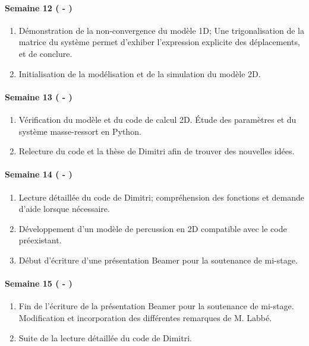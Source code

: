 \paragraph{Semaine 12 ( - )} 
\begin{enumerate}
    \item Démonstration de la non-convergence du modèle 1D; 
    Une trigonalisation de la matrice du système permet d'exhiber l'expression explicite des déplacements, et de conclure.
    \item Initialisation de la modélisation et de la simulation du modèle 2D.
  \end{enumerate}
  
\paragraph{Semaine 13 ( - )} 
\begin{enumerate}
    \item Vérification du modèle et du code de calcul 2D. Étude des paramètres et du système masse-ressort en Python.
    \item Relecture du code et la thèse de Dimitri afin de trouver des nouvelles idées.
\end{enumerate}


\paragraph{Semaine 14 ( - )} 
\begin{enumerate}
    \item Lecture détaillée du code de Dimitri; compréhension des fonctions et demande d'aide lorsque nécessaire.
    \item Développement d'un modèle de percussion en 2D compatible avec le code préexistant.
    \item Début d'écriture d'une présentation Beamer pour la soutenance de mi-stage.
\end{enumerate}
  

\paragraph{Semaine 15 ( - )} 
\begin{enumerate}
    \item Fin de l'écriture de la présentation Beamer pour la soutenance de mi-stage. Modification et incorporation des différentes remarques de M. Labbé. 
    \item Suite de la lecture détaillée du code de Dimitri.
  \end{enumerate}



